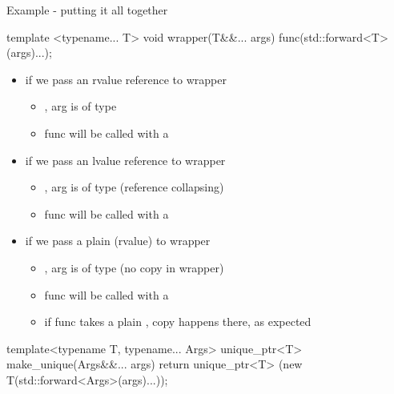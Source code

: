 \begin{frame}[fragile]
    \begin{exampleblock}{Example - putting it all together}
    \begin{cppcode}
      template <typename... T>
      void wrapper(T&&... args) {
        func(std::forward<T>(args)...);
      }
    \end{cppcode}
    \end{exampleblock}
  \begin{block}{}
    \begin{itemize}
    \item if we pass an rvalue reference  to wrapper
      \begin{itemize}
      \item {}, arg is of type 
      \item func will be called with a 
      \end{itemize}
    \item if we pass an lvalue reference  to wrapper
      \begin{itemize}
      \item {}, arg is of type  (reference collapsing)
      \item func will be called with a 
      \end{itemize}
    \item if we pass a plain  (rvalue) to wrapper
      \begin{itemize}
      \item {}, arg is of type  (no copy in wrapper)
      \item func will be called with a 
      \item if func takes a plain , copy happens there, as expected
      \end{itemize}
    \end{itemize}
  \end{block}
\end{frame}

\begin{frame}[fragile]
  \begin{block}{}
    \begin{cppcode*}{}
      template<typename T, typename... Args>
      unique_ptr<T> make_unique(Args&&... args) {
        return unique_ptr<T>
          (new T(std::forward<Args>(args)...));
      }
    \end{cppcode*}
  \end{block}
\end{frame}
